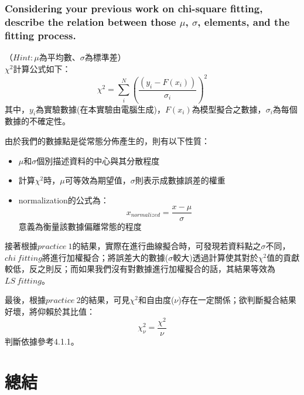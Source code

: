\documentclass[12pt,a4paper]{article}
\begin{document}
\begin{CJK}{UTF8}{bkai}
\clearpage

\subsubsection{Considering your previous work on chi-square fitting, describe the relation between those $\mu$, $\sigma$, elements, and the fitting process.}
\hfill

\noindent （$Hint:\mu$為平均數、$\sigma$為標準差）
\\

$\chi^2$計算公式如下：
\begin{equation}
    \chi^2=\sum_i^N(\frac{(y_i-F(x_i))}{\sigma_i})^2
    \nonumber
\end{equation}
其中，$y_i$為實驗數據(在本實驗由電腦生成)，$F(x_i)$為模型擬合之數據，$\sigma_i$為每個數據的不確定性。

由於我們的數據點是從常態分佈產生的，則有以下性質：
\begin{itemize}
    \item $\mu$和$\sigma$個別描述資料的中心與其分散程度
    \item 計算$\chi^2$時，$\mu$可等效為期望值，$\sigma$則表示成數據誤差的權重
    \item normalization的公式為：
    \begin{equation}
        x_{normalized}=\frac{x-\mu}{\sigma}
        \nonumber
    \end{equation}
    意義為衡量該數據偏離常態的程度
\end{itemize}

接著根據$practice\ 1$的結果，實際在進行曲線擬合時，可發現若資料點之$\sigma$不同，$chi\ fitting$將進行加權擬合；將誤差大的數據($\sigma$較大)透過計算使其對於$\chi^2$值的貢獻較低，反之則反；而如果我們沒有對數據進行加權擬合的話，其結果等效為$LS\ fitting$。

最後，根據$practice\ 2$的結果，可見$\chi^2$和自由度($\nu$)存在一定關係；欲判斷擬合結果好壞，將仰賴於其比值：
\begin{equation}
    \chi^2_\nu=\frac{\chi^2}{\nu}
    \nonumber
\end{equation}
判斷依據參考4.1.1。

\section{總結}
\hfill


\end{CJK}
\end{document}
